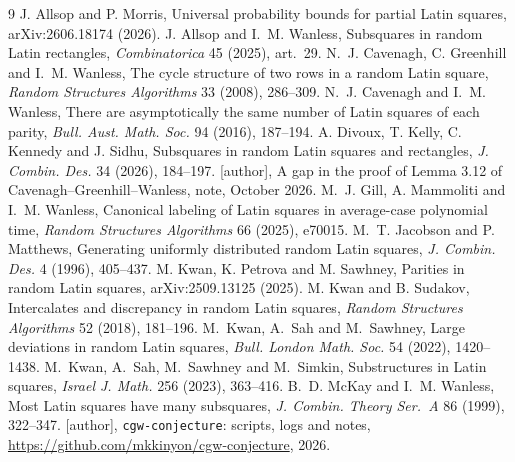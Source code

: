 \documentclass[11pt]{article}
\theoremstyle{definition}
\begin{document}
\begin{thebibliography}{9}
 J. Allsop and P. Morris, Universal probability bounds for partial Latin squares,
arXiv:2606.18174 (2026).
 J. Allsop and I.~M. Wanless, Subsquares in random Latin rectangles,
\emph{Combinatorica} 45 (2025), art.~29.
 N.~J. Cavenagh, C. Greenhill and I.~M. Wanless, The cycle structure of two
rows in a random Latin square, \emph{Random Structures Algorithms} 33 (2008), 286--309.
 N.~J. Cavenagh and I.~M. Wanless, There are asymptotically the same number of
Latin squares of each parity, \emph{Bull. Aust. Math. Soc.} 94 (2016), 187--194.
 A. Divoux, T. Kelly, C. Kennedy and J. Sidhu, Subsquares in random Latin
squares and rectangles, \emph{J. Combin. Des.} 34 (2026), 184--197.
 [author], A gap in the proof of Lemma 3.12 of Cavenagh--Greenhill--Wanless, note, October 2026.
 M.~J. Gill, A. Mammoliti and I.~M. Wanless, Canonical labeling of Latin
squares in average-case polynomial time, \emph{Random Structures Algorithms} 66 (2025), e70015.
 M.~T. Jacobson and P. Matthews, Generating uniformly distributed random Latin
squares, \emph{J. Combin. Des.} 4 (1996), 405--437.
 M. Kwan, K. Petrova and M. Sawhney, Parities in random Latin squares,
arXiv:2509.13125 (2025).
 M. Kwan and B. Sudakov, Intercalates and discrepancy in random Latin squares,
\emph{Random Structures Algorithms} 52 (2018), 181--196.
 M.~Kwan, A.~Sah and M.~Sawhney, Large deviations in random Latin squares,
\emph{Bull. London Math. Soc.} 54 (2022), 1420--1438.
 M.~Kwan, A.~Sah, M.~Sawhney and M.~Simkin, Substructures in Latin squares,
\emph{Israel J. Math.} 256 (2023), 363--416.
 B.~D. McKay and I.~M. Wanless, Most Latin squares have many subsquares,
\emph{J. Combin. Theory Ser.~A} 86 (1999), 322--347.
 [author], \texttt{cgw-conjecture}: scripts, logs and notes, \url{https://github.com/mkkinyon/cgw-conjecture}, 2026.
\end{thebibliography}
\end{document}
